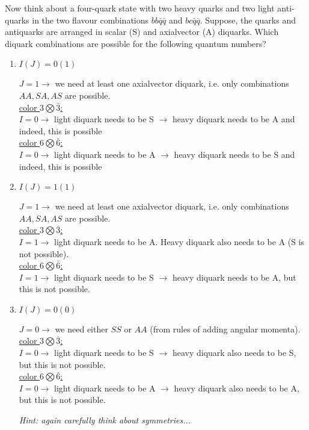 

	Now think about a four-quark state with two heavy quarks and two light anti-quarks in the two 
	flavour combinations $bb\bar{q}\bar{q}$ and $bc\bar{q}\bar{q}$. Suppose, the quarks and antiquarks are 
	arranged in scalar (S) and axialvector (A) diquarks. Which diquark combinations are possible for the following quantum numbers?

\begin{enumerate}
	\item $I(J) = 0(1)$ 
	
	\begin{solution}
		$J=1 \rightarrow$ we need at least one axialvector diquark, i.e. only combinations $AA, SA, AS$ are possible.\\ 
		\underline{color $3 \bigotimes \bar{3}$:}\\
		$I=0 \rightarrow$ light diquark needs to be S $\rightarrow$ heavy diquark needs to be A and indeed, this is possible\\
		\underline{color $6 \bigotimes \bar{6}$:}\\
        $I=0 \rightarrow$ light diquark needs to be A $\rightarrow$ heavy diquark needs to be S and indeed, this is possible		
    \end{solution}

	\item $I(J) = 1(1)$ 
	
	\begin{solution}
		$J=1 \rightarrow$ we need at least one axialvector diquark, i.e. only combinations $AA, SA, AS$ are possible.\\ 
        \underline{color $3 \bigotimes \bar{3}$:}\\
        $I=1 \rightarrow$ light diquark needs to be A. Heavy diquark also needs to be A (S is not possible).\\
        \underline{color $6 \bigotimes \bar{6}$:}\\
        $I=1 \rightarrow$ light diquark needs to be S $\rightarrow$ heavy diquark needs to be A, but this is not possible.		
    \end{solution}

	\item $I(J) = 0(0)$ 
	
	\begin{solution}
		$J=0 \rightarrow$ we need either $SS$ or $AA$ (from rules of adding angular momenta).\\ 
        \underline{color $3 \bigotimes \bar{3}$:}\\
        $I=0 \rightarrow$ light diquark needs to be S $\rightarrow$ heavy diquark also needs to be S, but this is not possible.\\
        \underline{color $6 \bigotimes \bar{6}$:}\\
        $I=0 \rightarrow$ light diquark needs to be A $\rightarrow$ heavy diquark also needs to be A, but this is not possible.		
    \end{solution}
	      
	{\em Hint: again carefully think about symmetries...}
	
	
	
\end{enumerate}